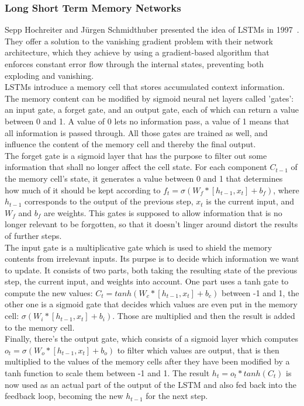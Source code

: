 \documentclass[
	a4paper,
	pagesize,
	pdftex,
	12pt,
	twoside, %
	BCOR=5mm, %
	ngerman,
	fleqn,
	final,
	]{scrartcl}
\begin{document}
\subsubsection{Long Short Term Memory Networks}\label{LSTM}
Sepp Hochreiter and Jürgen Schmidthuber presented the idea of LSTMs in 1997~\cite{Hochreiter.1997}. They offer a solution to the vanishing gradient problem with their network architecture, which they achieve by using a gradient-based algorithm that enforces constant error flow through the internal states, preventing both exploding and vanishing.\\
LSTMs introduce a memory cell that stores accumulated context information. The memory content can be modified by sigmoid neural net layers called 'gates': an input gate, a forget gate, and an output gate, each of which can return a value between 0 and 1. A value of 0 lets no information pass, a value of 1 means that all information is passed through. All those gates are trained as well, and influence the content of the memory cell and thereby the final output.\\
The forget gate is a sigmoid layer that has the purpose to filter out some information that shall no longer affect the cell state. For each component $C_{t-1}$ of the memory cell's state, it generates a value between 0 and 1 that determines how much of it should be kept according to $f_t = \sigma (W_f * [h_{t-1}, x_t] + b_f)$, where $h_{t-1}$ corresponds to the output of the previous step, $x_t$ is the current input, and $W_f$ and $b_f$ are weights. This gates is supposed to allow information that is no longer relevant to be forgotten, so that it doesn't linger around distort the results of further steps.\\
The input gate is a multiplicative gate which is used to shield the memory contents from irrelevant inputs. Its purpse is to decide which information we want to update. It consists of two parts, both taking the resulting state of the previous step, the current input, and weights into account. One part uses a tanh gate to compute the new values: $C_t = tanh (W_c * [h_{t-1} , x_t] + b_c)$ between -1 and 1, the other one is a sigmoid gate that decides which values are even put in the memory cell: $\sigma (W_i * [h_{t-1}, x_t] + b_i)$. Those are multiplied and then the result is added to the memory cell.\\
Finally, there's the output gate, which consists of a sigmoid layer which computes $o_t = \sigma (W_o * [h_{t-1}, x_t] + b_o)$ to filter which values are output, that is then multiplied to the values of the memory cells after they have been modified by a tanh function to scale them between -1 and 1. The result $h_t = o_t * tanh(C_t)$ is now used as an actual part of the output of the LSTM and also fed back into the feedback loop, becoming the new $h_{t-1}$ for the next step.	
\end{document}
